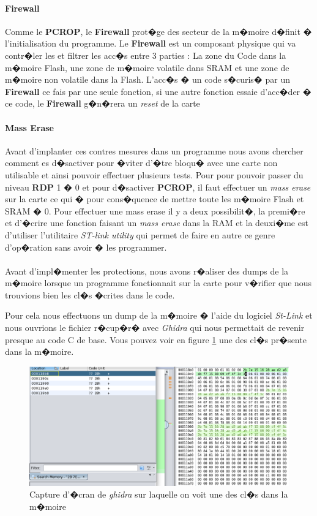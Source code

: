 \documentclass[a4paper, titlepage,12pt]{report}
\begin{document}
\paragraph{Firewall}
Comme le \textbf{PCROP}, le \textbf{Firewall} prot�ge des secteur de la m�moire d�finit � l'initialisation du programme. Le \textbf{Firewall} est un composant physique qui va contr�ler les et filtrer les acc�s entre 3 parties : La zone du Code dans la m�moire Flash, une zone de m�moire volatile dans SRAM et une zone de m�moire non volatile dans la Flash. L'acc�s � un code s�curis� par un \textbf{Firewall} ce fais par une seule fonction, si une autre fonction essaie d'acc�der � ce code, le \textbf{Firewall} g�n�rera un \textit{reset} de la carte

\paragraph{Mass Erase}
Avant d'implanter ces contres mesures dans un programme nous avons chercher comment es d�sactiver pour �viter d'�tre bloqu� avec une carte non utilisable et ainsi pouvoir effectuer plusieurs tests. Pour pour pouvoir passer du niveau \textbf{RDP} 1 � 0 et pour d�sactiver \textbf{PCROP}, il faut effectuer un \textit{mass erase} sur la carte ce qui � pour cons�quence de mettre toute les m�moire Flash et SRAM � 0. Pour effectuer une mass erase il y a deux possibilit�, la premi�re et d'�crire une fonction faisant un \textit{mass erase} dans la RAM et la deuxi�me est d'utiliser l'utilitaire \textit{ST-link utility} qui permet de faire en autre ce genre d'op�ration sans avoir � les programmer.

\paragraph{}
Avant d'impl�menter les protections, nous avons r�aliser des dumps de la m�moire lorsque un programme fonctionnait sur la carte pour v�rifier que nous trouvions bien les cl�s �crites dans le code.

Pour cela nous effectuons un dump de la m�moire � l'aide du logiciel \textit{St-Link} et nous ouvrions le fichier r�cup�r� avec \textit{Ghidra} qui nous permettait de revenir presque au code C de base. Vous pouvez voir en figure \ref{Cl�1figure4} une des cl�s pr�sente dans la m�moire.

\begin{figure}[!h]
\includegraphics[scale=0.45]{img/eps/FLUO+RechercheDeCles_CodeNonSecure.eps}
\caption{Capture d'�cran de \textit{ghidra} sur laquelle on voit une des cl�s dans la m�moire}
\label{Cl�1figure4}
\end{figure}
\end{document}
